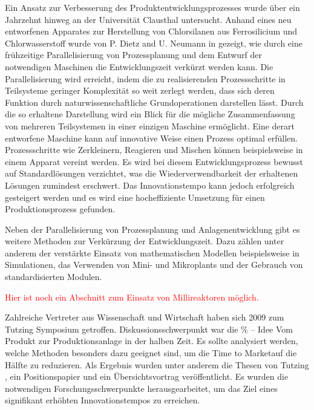 Ein Ansatz zur Verbesserung des Produktentwicklungsprozesses wurde \"uber ein Jahrzehnt hinweg an der Universit\"at Clausthal untersucht. Anhand eines neu entworfenen Apparates zur Herstellung von Chlorsilanen aus Ferrosilicium und Chlorwasserstoff wurde von P. Dietz and U.  Neumann in \cite{Dietz_2000} gezeigt, wie durch eine fr\"uhzeitige Parallelisierung von Prozessplanung und dem Entwurf der notwendigen Maschinen die Entwicklungszeit verk\"urzt werden kann. Die Parallelisierung wird erreicht, indem die zu realisierenden Prozessschritte in Teilsysteme geringer Komplexit\"at so weit zerlegt werden, dass sich deren Funktion durch naturwissenschaftliche Grundoperationen darstellen l\"asst. Durch die so erhaltene Darstellung wird ein Blick f\"ur die m\"ogliche Zusammenfassung von mehreren Teilsystemen in einer einzigen Maschine erm\"oglicht. Eine derart entworfene Maschine kann auf innovative Weise einen Prozess optimal erf\"ullen. Prozessschritte wie Zerkleinern, Reagieren und Mischen k\"onnen beispielsweise in einem Apparat vereint werden. Es wird bei diesem Entwicklungsprozess bewusst auf Standardl\"osungen verzichtet, was die Wiederverwendbarkeit der erhaltenen L\"osungen zumindest erschwert. Das Innovationstempo kann jedoch erfolgreich gesteigert werden und es wird eine hocheffiziente Umsetzung f\"ur einen  Produktionsprozess gefunden.  \hfill \newline

Neben der Parallelisierung von Prozessplanung und Anlagenentwicklung gibt es weitere Methoden zur Verk\"urzung der Entwicklungszeit. Dazu z\"ahlen unter anderem der verst\"arkte Einsatz von mathematischen Modellen beispielsweise in Simulationen, das Verwenden von Mini- und Mikroplants und der Gebrauch von standardisierten Modulen. \hfill \newline

\textcolor{red}{Hier ist noch ein Abschnitt zum Einsatz von Millireaktoren m\"oglich.} \hfill \newline

Zahlreiche Vertreter aus Wissenschaft und Wirtschaft haben sich 2009 zum Tutzing Symposium getroffen. Diskussionsschwerpunkt war die \% -- Idee Vom Produkt zur Produktionsanlage in der halben Zeit\grqq { }. Es sollte analysiert werden, welche Methoden besonders dazu geeignet sind, um die \glqq Time to Market\grqq { }auf die H\"alfte zu reduzieren. Als Ergebnis wurden unter anderem die Thesen von Tutzing \cite{Processnet_2009}, ein Positionspapier \cite{Processnet_2010} und ein \"Ubersichtsvortrag \cite{Schembecker_2009} ver\"offentlicht. Es wurden die notwendigen Forschungsschwerpunkte herausgearbeitet, um das Ziel eines signifikant erh\"ohten Innovationstempos zu erreichen. \hfill \newline


